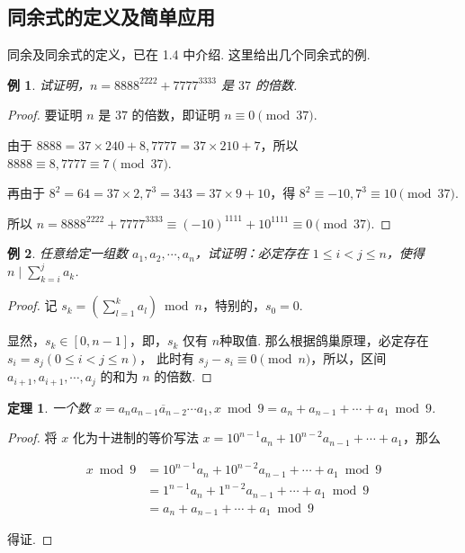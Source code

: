 \documentclass[a4paper]{article}
\newtheorem{theorem}{定理}[section]
\newtheorem{exam}{例}[subsection]
\begin{document}
\subsection{同余式的定义及简单应用}

同余及同余式的定义，已在 1.4 中介绍. 这里给出几个同余式的例.

\begin{exam}
    试证明，$n=8888^{2222}+7777^{3333}$ 是 $37$ 的倍数.
\end{exam}

\begin{proof}
    要证明 $n$ 是 $37$ 的倍数，即证明 $n\equiv 0 \pmod {37}$.

    由于 $8888=37\times 240+8,7777=37\times 210+7$，所以 $8888\equiv 8,7777\equiv 7\pmod {37}$.

    再由于 $8^2=64=37\times 2,7^3=343=37\times 9+10$，得 $8^2\equiv -10,7^3\equiv 10\pmod {37}$.

    所以 $n=8888^{2222}+7777^{3333}\equiv(-10)^{1111}+10^{1111}\equiv 0\pmod {37}$.
\end{proof}

\begin{exam}
    任意给定一组数 $a_1,a_2,\cdots,a_n$，试证明：必定存在 $1\le i<j\le n$，使得 $n\mid \sum\limits_{k=i}^j a_k$.
\end{exam}

\begin{proof}
    记 $s_k=(\sum\limits_{l=1}^k a_l)\bmod n$，特别的，$s_0=0$.

    显然，$s_k\in[0,n-1]$，即，$s_k$ 仅有 $n$种取值. 那么根据鸽巢原理，必定存在 $s_i=s_j(0\le i<j\le n)$，
    此时有 $s_j-s_i\equiv 0\pmod n$，所以，区间 $a_{i+1},a_{i+1},\cdots,a_j$ 的和为 $n$ 的倍数.
\end{proof}

\begin{theorem}
    一个数 $x=\overline{a_na_{n-1}a_{n-2}\cdots a_1},x\bmod 9 = a_n+a_{n-1}+\cdots + a_1\bmod 9$.
\end{theorem}

\begin{proof}
    将 $x$ 化为十进制的等价写法 $x=10^{n-1}a_n+10^{n-2}a_{n-1}+\cdots+a_1$，那么

    \begin{equation*}
        \begin{split}
            x\bmod 9 &=10^{n-1}a_n+10^{n-2}a_{n-1}+\cdots+a_1 \bmod 9\\
            &=1^{n-1}a_n+1^{n-2}a_{n-1}+\cdots+a_1\bmod 9\\
            &=a_n+a_{n-1}+\cdots + a_1\bmod 9
        \end{split}
    \end{equation*}

    得证.
\end{proof}
\end{document}
